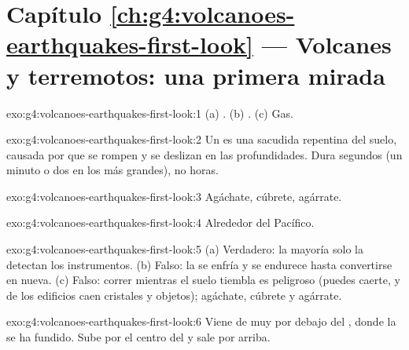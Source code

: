 \section*{Capítulo \ref{ch:g4:volcanoes-earthquakes-first-look} --- Volcanes y terremotos: una primera mirada}

\begin{solution}{exo:g4:volcanoes-earthquakes-first-look:1}
(a) . (b) . (c) Gas.
\end{solution}

\begin{solution}{exo:g4:volcanoes-earthquakes-first-look:2}
Un  es una sacudida repentina del suelo, causada por  que se
rompen y se deslizan en las profundidades. Dura segundos (un minuto o dos
en los más grandes), no horas.
\end{solution}

\begin{solution}{exo:g4:volcanoes-earthquakes-first-look:3}
Agáchate, cúbrete, agárrate.
\end{solution}

\begin{solution}{exo:g4:volcanoes-earthquakes-first-look:4}
Alrededor del  Pacífico.
\end{solution}

\begin{solution}{exo:g4:volcanoes-earthquakes-first-look:5}
(a) Verdadero: la mayoría solo la detectan los instrumentos. (b) Falso: la
 se enfría y se endurece hasta convertirse en  nueva. (c) Falso:
correr mientras el suelo tiembla es peligroso (puedes caerte, y de los
edificios caen cristales y objetos); agáchate, cúbrete y agárrate.
\end{solution}

\begin{solution}{exo:g4:volcanoes-earthquakes-first-look:6}
Viene de muy por debajo del , donde la  se ha fundido. Sube por el
centro del  y sale por arriba.
\end{solution}

